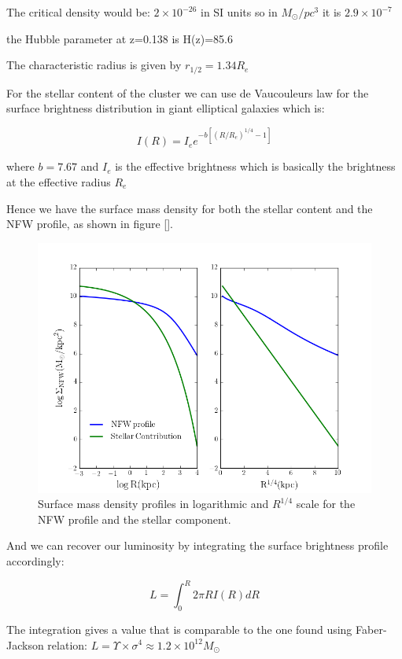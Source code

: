 The critical density would be: $2\times 10^{-26}$ in SI units so in $M_{\odot}/pc^{3}$ it is $2.9\times 10^{-7}$

the Hubble parameter at z=0.138 is H(z)=85.6

The characteristic radius is given by $r_{1/2}=1.34R_{e}$

For the stellar content of the cluster we can use de Vaucouleurs law for the surface brightness distribution in giant elliptical galaxies which is:

\begin{equation}
I(R)=I_{e}e^{-b\left[\left(R/R_{e}\right)^{1/4}-1\right]}
\end{equation}

where $b=7.67$ and $I_{e}$ is the effective brightness which is basically the brightness at the effective radius $R_{e}$

Hence we have the surface mass density for both the stellar content and the NFW profile, as shown in figure [].

\begin{figure}[H]
\centering
\includegraphics[width=12cm]{images/Surface_mass_density_log.png}
\caption[Surface mass density profiles]{Surface mass density profiles in logarithmic and $R^{1/4}$ scale for the NFW profile and the stellar component.}
\end{figure}

And we can recover our luminosity by integrating the surface brightness profile accordingly:

\begin{equation}
L=\int_{0}^{R}2\pi RI(R)dR
\end{equation}

The integration gives a value that is comparable to the one found using Faber-Jackson relation: $L=\Upsilon\times\sigma^{4}\approx 1.2\times 10^{12}M_{\odot}$

